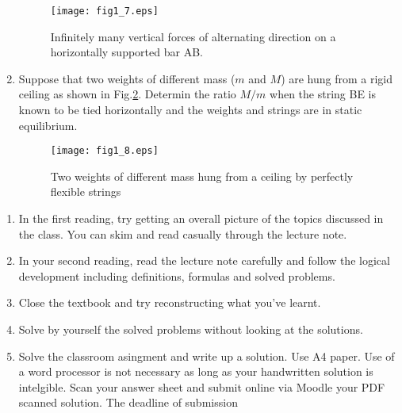 \documentclass[10pt,a4j]{article}
\begin{document}
\begin{enumerate}
\begin{figure}[h]
\begin{center}
	\texttt{[image: fig1\_7.eps]} 
	\end{center}
	\caption{Infinitely many vertical forces of alternating direction on 
	a horizontally supported bar AB.}
	\label{fig:fig1_7}
	\end{figure}
\item
	Suppose that two weights of different mass ($m$ and $M$) are 
	hung from a rigid ceiling as shown in Fig.\ref{fig:fig1_8}.
	Determin the ratio $M/m$ when the string BE is known to be tied horizontally 
	and the weights and strings are in static equilibrium.
	\begin{figure}[h]
		\begin{center}
		\texttt{[image: fig1\_8.eps]} 
		\end{center}
		\caption{Two weights of different mass hung from a ceiling by perfectly flexible strings} 
		\label{fig:fig1_8}
	\end{figure}
\end{enumerate}
%
\begin{enumerate}
\item
In the first reading, try getting an overall picture of the topics discussed in the class.
You can skim and read casually through the lecture note.
\item
In your second reading, read the lecture note carefully and follow the logical 
	development including definitions, formulas and solved problems.
\item
Close the textbook and try reconstructing what you've learnt.
\item
Solve by yourself the solved problems without looking at the solutions.
\item
Solve the classroom asingment and write up a solution. 
Use A4 paper. Use of a word processor is not necessary as long as your 
handwritten solution is intelgible. 
Scan your answer sheet and submit online via Moodle your PDF scanned solution.
The deadline of submission 
\end{enumerate}
\end{document}
